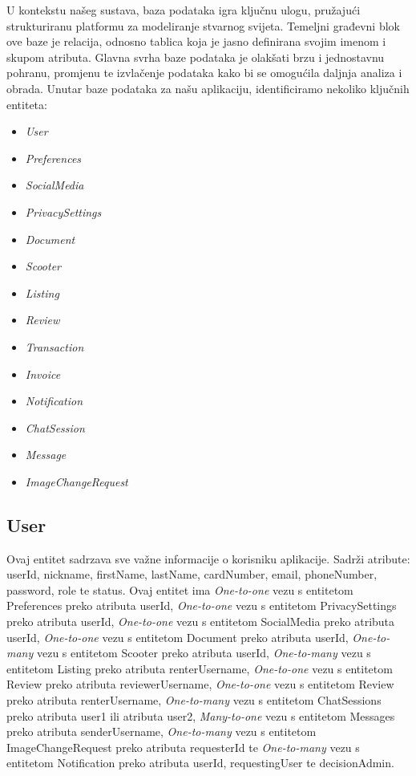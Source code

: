U kontekstu našeg sustava, baza podataka igra ključnu ulogu, pružajući strukturiranu platformu za modeliranje stvarnog svijeta. Temeljni građevni blok ove baze je relacija, odnosno tablica koja je jasno definirana svojim imenom i skupom atributa. Glavna svrha baze podataka je olakšati brzu i jednostavnu pohranu, promjenu te izvlačenje podataka kako bi se omogućila daljnja analiza i obrada. Unutar baze podataka za našu aplikaciju, identificiramo nekoliko ključnih entiteta:
	\begin{itemize}
		\item 	\textit{User}
		\item 	\textit{Preferences}
		\item 	\textit{SocialMedia}
		\item 	\textit{PrivacySettings}
		\item 	\textit{Document}
		\item 	\textit{Scooter}
		\item 	\textit{Listing}
		\item 	\textit{Review}
		\item 	\textit{Transaction}
		\item 	\textit{Invoice}
		\item 	\textit{Notification}
		\item 	\textit{ChatSession}
		\item 	\textit{Message}
		\item 	\textit{ImageChangeRequest}
	\end{itemize}


\subsection{User}


Ovaj entitet sadrzava sve važne informacije o korisniku aplikacije. Sadrži atribute: userId, nickname, firstName, lastName, cardNumber, email, phoneNumber, password, role te status. Ovaj entitet ima \textit{One-to-one} vezu s entitetom Preferences preko atributa userId, \textit{One-to-one} vezu s entitetom PrivacySettings preko atributa userId, \textit{One-to-one} vezu s entitetom SocialMedia preko atributa userId, \textit{One-to-one} vezu s entitetom Document preko atributa userId, \textit{One-to-many} vezu s entitetom Scooter preko atributa userId, \textit{One-to-many} vezu s entitetom Listing preko atributa renterUsername, \textit{One-to-one} vezu s entitetom Review preko atributa reviewerUsername, \textit{One-to-one} vezu s entitetom Review preko atributa renterUsername, \textit{One-to-many} vezu s entitetom ChatSessions preko atributa user1 ili atributa user2, \textit{Many-to-one} vezu s entitetom Messages preko atributa senderUsername, \textit{One-to-many} vezu s entitetom ImageChangeRequest preko atributa requesterId te \textit{One-to-many} vezu s entitetom Notification preko atributa userId, requestingUser te decisionAdmin.


